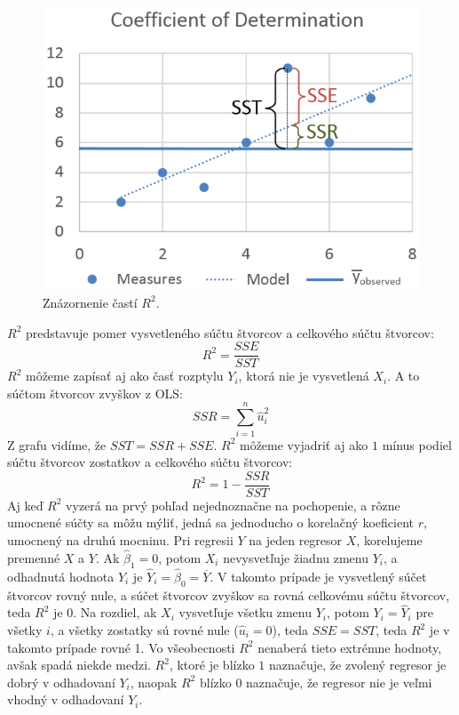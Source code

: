 \documentclass[]{tukediphc}
\begin{document}
\begin{figure}[!ht]
    \centering
    \includegraphics[scale = 0.5]{diplomka obrazky/11.png}
    \caption{Znázornenie častí $R^2$.}
\end{figure}
$R^2$ predstavuje pomer vysvetleného súčtu štvorcov a celkového súčtu štvorcov:
\begin{equation}
    R^2 = \frac{SSE}{SST}
\end{equation}
$R^2$ môžeme zapísať aj ako časť rozptylu $Y_i$, ktorá nie je vysvetlená $X_i$. A to súčtom štvorcov zvyškov z OLS: 
\begin{equation}
    SSR = \sum_{i=1}^{n}\hat{u}_{i}^2
\end{equation}
Z grafu vidíme, že $SST = SSR + SSE$. $R^2$ môžeme vyjadriť aj ako $1$ mínus podiel súčtu štvorcov zostatkov a celkového súčtu štvorcov: 
\begin{equation}
    R^2 = 1 - \frac{SSR}{SST}
\end{equation}
Aj keď $R^2$ vyzerá na prvý pohľad nejednoznačne na pochopenie, a rôzne umocnené súčty sa môžu mýliť, jedná sa jednoducho o korelačný koeficient $r$, umocnený na druhú mocninu. Pri regresii $Y$ na jeden regresor $X$, korelujeme premenné $X$ a $Y$. Ak $\hat\beta_1 = 0$, potom $X_i$ nevysvetľuje žiadnu zmenu $Y_i$, a odhadnutá hodnota $Y_i$ je $\hat{Y}_{i} = \hat\beta_0  = {\overline{Y}}$. V takomto prípade je vysvetlený súčet štvorcov rovný nule, a súčet štvorcov zvyškov sa rovná celkovému súčtu štvorcov, teda $R^2$ je 0. Na rozdiel, ak $X_i$ vysvetľuje všetku zmenu $Y_i$, potom $Y_i = \hat{Y}_{i}$ pre všetky $i$, a všetky zostatky sú rovné nule ($\hat{u}_{i} = 0$), teda $SSE = SST$, teda $R^2$ je v takomto prípade rovné 1. Vo všeobecnosti $R^2$ nenaberá tieto extrémne hodnoty, avšak spadá niekde medzi. $R^2$, ktoré je blízko $1$ naznačuje, že zvolený regresor je dobrý v odhadovaní $Y_i$, naopak $R^2$ blízko 0 naznačuje, že regresor nie je veľmi vhodný v odhadovaní $Y_i$. 
\end{document}
